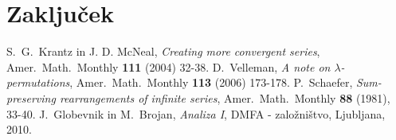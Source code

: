 \documentclass[12pt,a4paper,reqno]{amsart}
\theoremstyle{definition} %
\theoremstyle{plain} %
\begin{document}
\section{Zaključek}



\begin{thebibliography}{99}

S.~G.~Krantz in J. D. McNeal, \textit{Creating more convergent series}, Amer.~Math.~Monthly \textbf{111} (2004) 32-38.
D.~Velleman, \textit{A note on $\lambda$-permutations}, Amer.~Math.~Monthly \textbf{113} (2006) 173-178.
P.~Schaefer, \textit{Sum-preserving rearrangements of infinite series}, Amer.~Math.~Monthly \textbf{88} (1981), 33-40.
J.~Globevnik in M.~Brojan, \textit{Analiza I},  DMFA - založništvo, Ljubljana, 2010.

\end{thebibliography}
\end{document}
